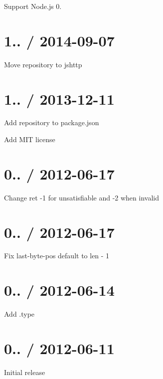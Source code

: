 
\begin{DoxyItemize}
\item Support Node.\+js 0.
\end{DoxyItemize}

\section*{1.. / 2014-\/09-\/07 }


\begin{DoxyItemize}
\item Move repository to jshttp
\end{DoxyItemize}

\section*{1.. / 2013-\/12-\/11 }


\begin{DoxyItemize}
\item Add repository to package.\+json
\item Add M\+I\+T license
\end{DoxyItemize}

\section*{0.. / 2012-\/06-\/17 }


\begin{DoxyItemize}
\item Change ret -\/1 for unsatisfiable and -\/2 when invalid
\end{DoxyItemize}

\section*{0.. / 2012-\/06-\/17 }


\begin{DoxyItemize}
\item Fix last-\/byte-\/pos default to len -\/ 1
\end{DoxyItemize}

\section*{0.. / 2012-\/06-\/14 }


\begin{DoxyItemize}
\item Add {\ttfamily .type}
\end{DoxyItemize}

\section*{0.. / 2012-\/06-\/11 }


\begin{DoxyItemize}
\item Initial release 
\end{DoxyItemize}